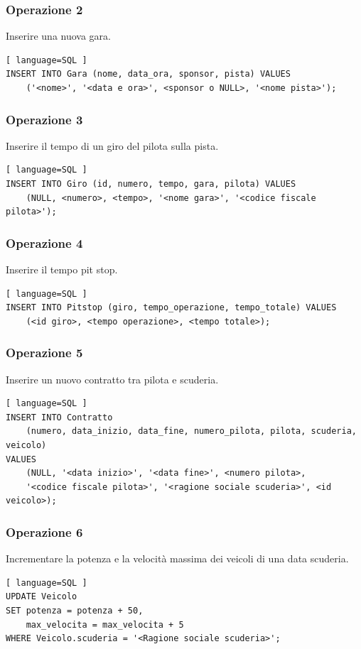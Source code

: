 \documentclass[11pt]{article}
\begin{document}
\subsubsection{Operazione 2}
Inserire una nuova gara.
\begin{lstlisting}[ language=SQL ]
INSERT INTO Gara (nome, data_ora, sponsor, pista) VALUES 
    ('<nome>', '<data e ora>', <sponsor o NULL>, '<nome pista>');
\end{lstlisting}


\subsubsection{Operazione 3}
Inserire il tempo di un giro del pilota sulla pista.
\begin{lstlisting}[ language=SQL ]
INSERT INTO Giro (id, numero, tempo, gara, pilota) VALUES 
    (NULL, <numero>, <tempo>, '<nome gara>', '<codice fiscale pilota>');
\end{lstlisting}


\subsubsection{Operazione 4}
Inserire il tempo pit stop.
\begin{lstlisting}[ language=SQL ]
INSERT INTO Pitstop (giro, tempo_operazione, tempo_totale) VALUES 
    (<id giro>, <tempo operazione>, <tempo totale>);
\end{lstlisting}


\subsubsection{Operazione 5}
Inserire un nuovo contratto tra pilota e scuderia.
\begin{lstlisting}[ language=SQL ]
INSERT INTO Contratto 
    (numero, data_inizio, data_fine, numero_pilota, pilota, scuderia, veicolo) 
VALUES 
    (NULL, '<data inizio>', '<data fine>', <numero pilota>, 
    '<codice fiscale pilota>', '<ragione sociale scuderia>', <id veicolo>);
\end{lstlisting}


\subsubsection{Operazione 6}
Incrementare la potenza e la velocità massima dei veicoli di una data scuderia.
\begin{lstlisting}[ language=SQL ]
UPDATE Veicolo
SET potenza = potenza + 50,
    max_velocita = max_velocita + 5
WHERE Veicolo.scuderia = '<Ragione sociale scuderia>';   
\end{lstlisting}
\end{document}

